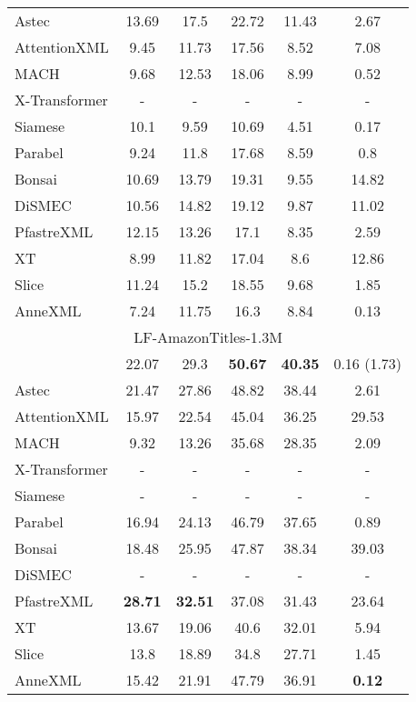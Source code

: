 \begin{table}[ht]
{\begin{tabular}{@{}l|cc|cc|c@{}}
Astec	 & 13.69	 & 17.5	 & 22.72	 & 11.43	 & 2.67\\
AttentionXML	 & 9.45	 & 11.73	 & 17.56	 & 8.52	 & 7.08\\
MACH	 & 9.68	 & 12.53	 & 18.06	 & 8.99	 & 0.52\\
X-Transformer	 & -	 & -	 & -	 & -	 & -\\
Siamese	 & 10.1	 & 9.59	 & 10.69	 & 4.51	 & 0.17\\
Parabel	 & 9.24	 & 11.8	 & 17.68	 & 8.59	 & 0.8\\
Bonsai	 & 10.69	 & 13.79	 & 19.31	 & 9.55	 & 14.82\\
DiSMEC	 & 10.56	 & 14.82	 & 19.12	 & 9.87	 & 11.02\\
PfastreXML	 & 12.15	 & 13.26	 & 17.1	 & 8.35	 & 2.59\\
XT	 & 8.99	 & 11.82	 & 17.04	 & 8.6	 & 12.86\\
Slice	 & 11.24	 & 15.2	 & 18.55	 & 9.68	 & 1.85\\
AnneXML	 & 7.24	 & 11.75	 & 16.3	 & 8.84	 & 0.13\\
\midrule
\multicolumn{6}{c}{LF-AmazonTitles-1.3M}\\ \midrule					
\alg	 & 22.07	 & 29.3	 & \textbf{50.67}	 & \textbf{40.35}	 & 0.16 (1.73)\\
Astec	 & 21.47	 & 27.86	 & 48.82	 & 38.44	 & 2.61\\
AttentionXML	 & 15.97	 & 22.54	 & 45.04	 & 36.25	 & 29.53\\
MACH	 & 9.32	 & 13.26	 & 35.68	 & 28.35	 & 2.09\\
X-Transformer	 & -	 & -	 & -	 & -	 & -\\
Siamese	 & -	 & -	 & -	 & -	 & -\\
Parabel	 & 16.94	 & 24.13	 & 46.79	 & 37.65	 & 0.89\\
Bonsai	 & 18.48	 & 25.95	 & 47.87	 & 38.34	 & 39.03\\
DiSMEC	 & -	 & -	 & -	 & -	 & -\\
PfastreXML	 & \textbf{28.71}	 & \textbf{32.51}	 & 37.08	 & 31.43	 & 23.64\\
XT	 & 13.67	 & 19.06	 & 40.6	 & 32.01	 & 5.94\\
Slice	 & 13.8	 & 18.89	 & 34.8	 & 27.71	 & 1.45\\
AnneXML	 & 15.42	 & 21.91	 & 47.79	 & 36.91	 & \textbf{0.12}\\
        \bottomrule
    \end{tabular}}
\end{table}